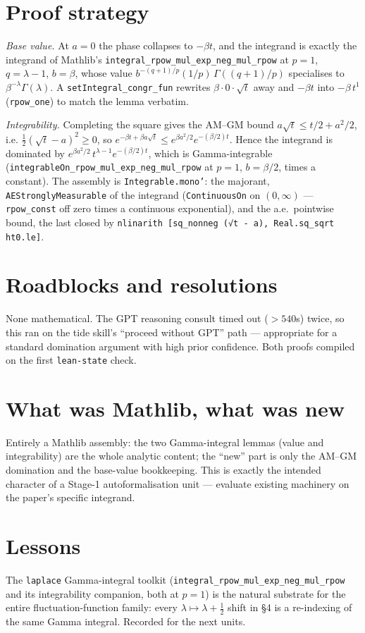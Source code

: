 \documentclass[11pt]{article}
\begin{document}
\section{Proof strategy}
\emph{Base value.} At $a=0$ the phase collapses to $-\beta t$, and the integrand is exactly the
integrand of Mathlib's \texttt{integral\_rpow\_mul\_exp\_neg\_mul\_rpow} at $p=1$, $q=\lambda-1$,
$b=\beta$, whose value $b^{-(q+1)/p}(1/p)\,\Gamma((q+1)/p)$ specialises to $\beta^{-\lambda}\Gamma(\lambda)$.
A \texttt{setIntegral\_congr\_fun} rewrites $\beta\cdot 0\cdot\sqrt t$ away and $-\beta t$ into
$-\beta\,t^{1}$ (\texttt{rpow\_one}) to match the lemma verbatim.

\emph{Integrability.} Completing the square gives the AM--GM bound $a\sqrt t\le t/2+a^2/2$, i.e.
$\tfrac12(\sqrt t-a)^2\ge 0$, so $e^{-\beta t+\beta a\sqrt t}\le e^{\beta a^2/2}e^{-(\beta/2)t}$. Hence
the integrand is dominated by $e^{\beta a^2/2}\,t^{\lambda-1}e^{-(\beta/2)t}$, which is Gamma-integrable
(\texttt{integrableOn\_rpow\_mul\_exp\_neg\_mul\_rpow} at $p=1$, $b=\beta/2$, times a constant). The
assembly is \texttt{Integrable.mono'}: the majorant, \texttt{AEStronglyMeasurable} of the integrand
(\texttt{ContinuousOn} on $(0,\infty)$ --- \texttt{rpow\_const} off zero times a continuous exponential),
and the a.e.\ pointwise bound, the last closed by
\texttt{nlinarith [sq\_nonneg (√t - a), Real.sq\_sqrt ht0.le]}.

\section{Roadblocks and resolutions}
None mathematical. The GPT reasoning consult timed out ($>540$s) twice, so this ran on the tide
skill's ``proceed without GPT'' path --- appropriate for a standard domination argument with high
prior confidence. Both proofs compiled on the first \texttt{lean-state} check.

\section{What was Mathlib, what was new}
Entirely a Mathlib assembly: the two Gamma-integral lemmas (value and integrability) are the whole
analytic content; the ``new'' part is only the AM--GM domination and the base-value bookkeeping. This
is exactly the intended character of a Stage-1 autoformalisation unit --- evaluate existing machinery
on the paper's specific integrand.

\section{Lessons}
The \texttt{laplace} Gamma-integral toolkit (\texttt{integral\_rpow\_mul\_exp\_neg\_mul\_rpow} and its
integrability companion, both at $p=1$) is the natural substrate for the entire fluctuation-function
family: every $\lambda\mapsto\lambda+\tfrac12$ shift in \S4 is a re-indexing of the same Gamma
integral. Recorded for the next units.
\end{document}
